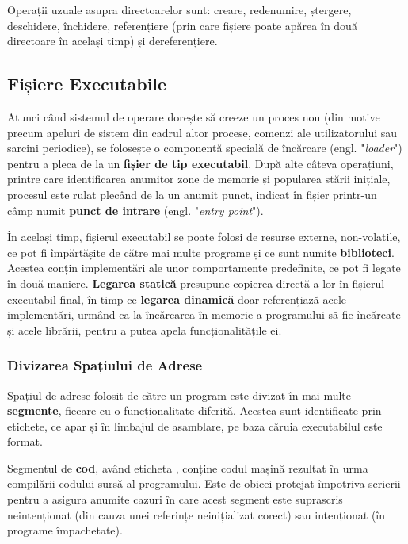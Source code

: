 \documentclass[../../main.tex]{subfiles}
\begin{document}
Operații uzuale asupra directoarelor sunt: creare, redenumire, ștergere, des\-chidere, închidere, referențiere (prin care fișiere poate apărea în două directoare în același timp) și dereferențiere.

\subsection{Fișiere Executabile}

Atunci când sistemul de operare dorește să creeze un proces nou (din motive precum apeluri de sistem din cadrul altor procese, comenzi ale utilizatorului sau sarcini periodice), se folosește o componentă specială de încărcare (engl. "\textit{loader}") pentru a pleca de la un \textbf{fișier de tip executabil}. După alte câteva operațiuni, printre care identificarea anumitor zone de memorie și popularea stării inițiale, procesul este rulat plecând de la un anumit punct, indicat în fișier printr-un câmp numit \textbf{punct de intrare} (engl. "\textit{entry point}").

În același timp, fișierul executabil se poate folosi de resurse externe, non-volatile, ce pot fi împărtășite de către mai multe programe și ce sunt numite \textbf{biblioteci}. Acestea conțin implementări ale unor comportamente predefinite, ce pot fi legate în două maniere. \textbf{Legarea statică} presupune copierea directă a lor în fișierul executabil final, în timp ce \textbf{legarea dinamică} doar referențiază acele implementări, urmând ca la încărcarea în memorie a programului să fie încărcate și acele librării, pentru a putea apela funcționalitățile ei.

\subsubsection{Divizarea Spațiului de Adrese}

Spațiul de adrese folosit de către un program este divizat în mai multe \textbf{segmente}, fiecare cu o funcționalitate diferită. Acestea sunt identificate prin etichete, ce apar și în limbajul de asamblare, pe baza căruia executabilul este format.

Segmentul de \textbf{cod}, având eticheta , conține codul mașină rezultat în urma compilării codului sursă al programului. Este de obicei protejat împotriva scrierii pentru a asigura anumite cazuri în care acest segment este suprascris neintenționat (din cauza unei referințe neinițializat corect) sau intenționat (în programe împachetate).
\end{document}
